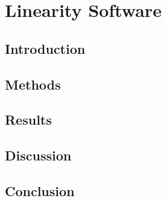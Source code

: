 \chapter{Linearity Software}
\label{chapterlabel}

\blindtext

\section{Introduction}

\section{Methods}

\section{Results}

\section{Discussion}

\section{Conclusion}